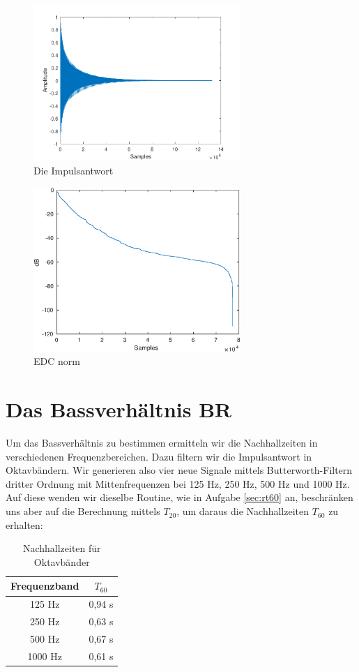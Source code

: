 \begin{figure}[H]
    \center
    \includegraphics[width = 0.7\textwidth]{figures/samples}
    \caption{Die Impulsantwort}
    \label{fig:im}
\end{figure}

\begin{figure}[H]
    \center
    \includegraphics[width = 0.7\textwidth]{figures/EDC_norm.eps}
    \caption{EDC norm}
    \label{fig:edc}
\end{figure}

\section{Das Bassverhältnis $\mathbf{BR}$}
\label{sec:br}
Um das Bassverhältnis zu bestimmen ermitteln wir die Nachhallzeiten in verschiedenen Frequenzbereichen. Dazu filtern wir die Impulsantwort in Oktavbändern.
Wir generieren also vier neue Signale mittels Butterworth-Filtern dritter Ordnung mit Mittenfrequenzen bei 125 Hz, 250 Hz, 500 Hz und 1000 Hz. Auf diese wenden wir dieselbe Routine, wie in Aufgabe \ref{sec:rt60} an, beschränken uns aber auf die Berechnung mittels $T_{20}$, um daraus die Nachhallzeiten $T_{60}$ zu erhalten:
\begin{table}[H]
\centering
\caption{Nachhallzeiten für Oktavbänder}
\label{tab:T_band}
\begin{tabular}{ | c | c |}
\hline
  Frequenzband & $T_{60}$ \\
  \hline
  125 Hz &  0,94 s \\
  250 Hz & 0,63 s \\
  500 Hz & 0,67 s \\
  1000 Hz & 0,61 s  \\
  \hline
  \end{tabular}
\end{table}

